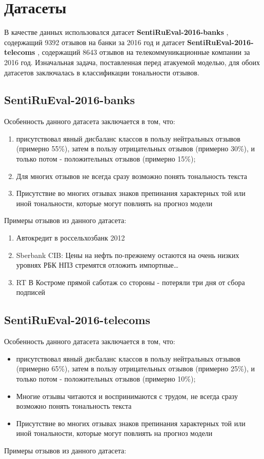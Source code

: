 \section{Датасеты}
\label{sec:Datasets} 

\hspace{0.6cm}В качестве данных использовался датасет \textbf{SentiRuEval-2016-banks} \cite{data1}, содержащий 9392 отзывов на банки за 2016 год и датасет \textbf{SentiRuEval-2016-telecoms} \cite{data1}, содержащий 8643 отзывов на телекоммуникационные компании за 2016 год. Изначальная задача, поставленная перед атакуемой моделью, для обоих датасетов заключалась в классификации тональности отзывов.

\subsection{SentiRuEval-2016-banks}
Особенность данного датасета заключается в том, что:

\begin{enumerate}
    \item присутствовал явный дисбаланс классов в пользу нейтральных отзывов (примерно 55\%), затем в пользу отрицательных отзывов (примерно 30\%), и только потом - положительных отзывов (примерно 15\%);
    \item Для многих отзывов не всегда сразу возможно понять тональность текста
    \item Присутствие во многих отзывах знаков препинания характерных той или иной тональности, которые могут повлиять на прогноз модели
\end{enumerate}
Примеры отзывов из данного датасета:

\begin{enumerate}
    \item Автокредит в россельхозбанк 2012
    \item Sberbank CIB: Цены на нефть по-прежнему остаются на очень низких уровнях РБК НПЗ стремятся отложить импортные…
    \item RT В Костроме прямой саботаж со стороны - потеряли три дня от сбора подписей
\end{enumerate}

\subsection{SentiRuEval-2016-telecoms}
Особенность данного датасета заключается в том, что:

\begin{itemize}
    \item присутствовал явный дисбаланс классов в пользу нейтральных отзывов (примерно 65\%), затем в пользу отрицательных отзывов (примерно 25\%), и только потом - положительных отзывов (примерно 10\%);
    \item Многие отзывы читаются и воспринимаются с трудом, не всегда сразу возможно понять тональность текста
    \item Присутствие во многих отзывах знаков препинания характерных той или иной тональности, которые могут повлиять на прогноз модели
\end{itemize}
Примеры отзывов из данного датасета:

